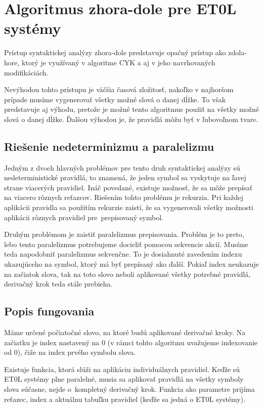\section{Algoritmus zhora-dole pre ET0L systémy}
\label{top-downET0L}
Prístup syntaktickej analýzy zhora-dole predstavuje opačný prístup ako zdola-hore, ktorý je využívaný v algoritme CYK a aj v jeho navrhovaných modifikáciách.

Nevýhodou tohto prístupu je väčšia časová zložitosť, nakoľko v najhoršom prípade musíme vygenerovať všetky možné slová o danej dĺžke. To však predstavuje aj výhodu, pretože je možné tento algoritmus použiť na všetky možné slová o danej dĺžke. Ďalšou výhodou je, že pravidlá môžu byť v ľubovoľnom tvare.

\subsection*{Riešenie nedeterminizmu a paralelizmu}
Jedným z dvoch hlavných problémov pre tento druh syntaktickej analýzy sú nedeterministické pravidlá, to znamená, že jeden symbol sa vyskytuje na ľavej strane viacerých pravidiel. Ináč povedané, existuje možnosť, že sa môže prepísať na viacero rôznych reťazcov. Riešením tohto problému je rekurzia. Pri každej aplikácii pravidla sa použitím rekurzie zaistí, že sa vygenerovali všetky možnosti aplikácii rôznych pravidiel pre~prepisovaný symbol.

Druhým problémom je zaistiť paralelizmus prepisovania. Problém je to preto, lebo tento paralelizmus potrebujeme docieliť pomocou sekvencie akcií. Musíme teda napodobniť paralelizmus sekvenčne. To je dosiahnuté zavedením indexu ukazujúceho na symbol, ktorý má byť prepísaný ako ďalší. Pokiaľ index neukazuje na začiatok slova, tak na toto slovo neboli aplikované všetky potrebné pravidlá, derivačný krok teda stále prebieha.

\subsection*{Popis fungovania}
Máme určené počiatočné slovo, na ktoré budú aplikované derivačné kroky. Na začiatku je index nastavený na 0 (v rámci tohto algoritmu uvažujeme indexovanie od 0), čiže na index prvého symbolu slova.

Existuje funkcia, ktorá slúži na aplikáciu individuálnych pravidiel. Keďže sú ET0L systémy plne paralelné, musia sa aplikovať pravidlá na všetky symboly slova súčasne, nejde o~kompletný derivačný krok. Funkcia ako parametre prijíma reťazec, index a aktuálnu tabuľku pravidiel (keďže sa jedná o ET0L systémy).

